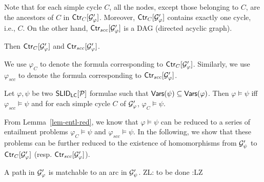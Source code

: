 \documentclass{llncs}
\newcommand{\zhilin}[1]{\color{red} {ZL: #1 :LZ} \color{black}}
\newcommand{\tl}[1]{\color{blue} {TL: #1 :LT} \color{black}}
\begin{document}
Note that for each simple cycle $C$, all the nodes, except those belonging to $C$, are the ancestors of $C$ in ${\sf Ctr}_C[\mathcal{G}'_\varphi]$. Moreover, ${\sf Ctr}_C[\mathcal{G}'_\varphi]$ contains exactly one cycle, i.e., $C$. On the other hand, ${\sf Ctr}_{scc}[\mathcal{G}'_\varphi]$ is a DAG (directed acyclic graph).

\begin{example}
Then ${\sf Ctr}_C[\mathcal{G}'_\varphi]$ and ${\sf Ctr}_{scc}[\mathcal{G}'_\varphi]$.
\end{example}

We use $\varphi_C$ to denote the formula corresponding to ${\sf Ctr}_C[\mathcal{G}'_\varphi]$. Similarly, we use $\varphi_{scc}$ to denote the formula corresponding to ${\sf Ctr}_{scc}[\mathcal{G}'_\varphi]$.



\vspace{-2mm}
\begin{lemma}\label{lem-entl-red}
Let $\varphi, \psi$ be two ${\sf SLID_{LC} }[\mathcal{P}]$ formulae such that $\mathsf{Vars}(\psi) \subseteq \mathsf{Vars}(\varphi)$. Then $\varphi  \models \psi$ iff $\varphi_{scc} \models \psi$ and for each simple cycle $C$ of $\mathcal{G}'_\varphi$, $\varphi_C \models \psi$.
\end{lemma}
\vspace{-2mm}



From Lemma~\ref{lem-entl-red}, we know that $\varphi \models \psi$ can be reduced to a series of entailment problems $\varphi_C \models \psi$ and $\varphi_{scc} \models \psi$. In the following, we show that these problems can be further reduced to the existence of homomorphisms from $\mathcal{G}'_\psi$ to ${\sf Ctr}_C[\mathcal{G}'_\varphi]$ (resp. ${\sf Ctr}_{scc}[\mathcal{G}'_\varphi]$).

\begin{definition}
A path in $\mathcal{G}'_\varphi$ is matchable to an arc in $\mathcal{G}'_\psi$. \zhilin{to be done}
\end{definition}


\end{document}

